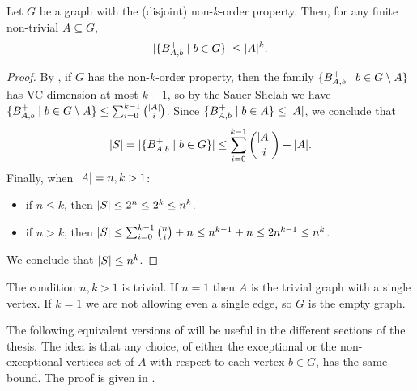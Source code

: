         \begin{lemma} \label{lem:k_order_property_bounds_BAbs}
            Let $G$ be a graph with the (disjoint) non-$k$-order property.
            Then, for any finite non-trivial $A \subseteq G$,
            \[
                | \{ B^+_{A,b} \mid b \in G \} | \leq |A|^k.
            \]
            \begin{proof}
                By , if $G$ has the non-$k$-order property,
                then the family $\{ B^+_{A,b} \mid b \in G \setminus A \}$ has VC-dimension at most $k-1$,
                so by the Sauer-Shelah  we have
                $\{ B^+_{A,b} \mid b \in G \setminus A \} \leq \sum_{i=0}^{k-1} \binom{|A|}{i}$.
                Since $\{ B^+_{A,b} \mid b \in A \} \leq | A |$, we conclude that
                \[
                    | S | = | \{ B^+_{A,b} \mid b \in G \} | \leq \sum_{i=0}^{k-1} \binom{|A|}{i} + |A|.
                \]
                Finally, when $| A | = n,k > 1$:
                \begin{itemize}
                    \item if $n \leq k$, then $| S | \leq 2^n \leq 2^k \leq n^k$.
                    \item if $n > k$, then $| S | \leq \sum_{i=0}^{k-1} {n \choose i} + n \leq n^{k-1} + n \leq 2n^{k-1} \leq n^k$.
                \end{itemize}
                We conclude that $| S | \leq n^k$.
            \end{proof}
        \end{lemma}

        \begin{remark}
            The condition $n,k > 1$ is trivial.
            If $n=1$ then $A$ is the trivial graph with a single vertex.
            If $k=1$ we are not allowing even a single edge, so $G$ is the empty graph.
        \end{remark}

        The following equivalent versions of  will be useful
        in the different sections of the thesis.
        The idea is that any choice, of either the exceptional or the non-exceptional vertices set of $A$ with respect to
        each vertex $b \in G$, has the same bound.
        The proof is given in .

